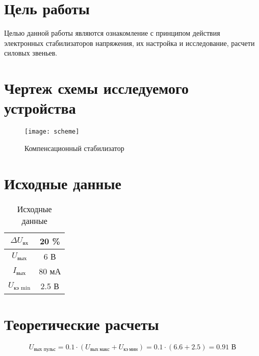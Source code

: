 





\section{Цель работы}

Целью данной работы являются ознакомление с принципом действия электронных стабилизаторов напряжения, их настройка и исследование, расчети силовых звеньев.

\section{Чертеж схемы исследуемого устройства}

\begin{figure}[H]
\begin{center}
	\texttt{[image: scheme]}
	\caption{Компенсационный стабилизатор}
\end{center}
\end{figure}

\vspace{-0.5cm}

\section{Исходные данные}

\begin{table}[H]
\begin{center}
	\caption{Исходные данные}
	\def\tabcolsep{36pt}
	\begin{tabular}{|c|c|}
		\hline 
		$\Delta U_\text{вх}$ & 20 \% \\ 
		\hline 
		$U_\text{вых}$ & 6 В \\ 
		\hline 
		$I_\text{вых}$ & 80 мА \\  
		\hline 
		$U_\text{кэ\ min}$ & 2.5 В \\ 
		\hline 
	\end{tabular} 
\end{center}
\end{table}

\newpage

\section{Теоретические расчеты}

\begin{displaymath}
	U_\text{вых\ пульс} = 0.1 \cdot ( U_{\text{вых}\ макс} + U_{\text{кэ}\ мин} ) = 0.1 \cdot ( 6.6 + 2.5 ) = 0.91 \text{ В}
\end{displaymath}

